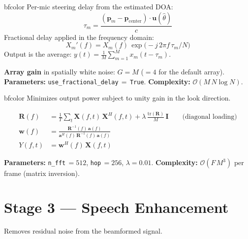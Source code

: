 \documentclass[11pt,a4paper]{article}
\begin{document}
\begin{modulebox}{bfcolor}
Per-mic steering delay from the estimated DOA:
\begin{equation}
\tau_m = \frac{(\mathbf{p}_m - \mathbf{p}_{\text{center}})\cdot\mathbf{u}(\hat\theta)}{c}
\end{equation}
Fractional delay applied in the frequency domain:
\begin{equation}
X_m'(f) = X_m(f)\,\exp\!\big(-j\,2\pi f\,\tau_m / N\big)
\end{equation}
Output is the average: $\displaystyle y(t) = \frac{1}{M}\sum_{m=1}^{M} x_m(t - \tau_m)$.

\medskip\noindent
\textbf{Array gain} in spatially white noise: $G = M$ ($= 4$ for the default array).\\
\textbf{Parameters:} \texttt{use\_fractional\_delay}$\,=$\,\texttt{True}.\quad
\textbf{Complexity:} $\mathcal{O}(M\,N\log N)$.
\end{modulebox}

\begin{modulebox}{bfcolor}
Minimizes output power subject to unity gain in the look direction.

\begin{align}
\mathbf{R}(f) &= \frac{1}{T}\sum_t \mathbf{X}(f,t)\,\mathbf{X}^H(f,t) + \lambda\,\frac{\text{tr}(\mathbf{R})}{M}\,\mathbf{I}
\qquad\text{(diagonal loading)} \\[4pt]
\mathbf{w}(f) &= \frac{\mathbf{R}^{-1}(f)\,\mathbf{a}(f)}{\mathbf{a}^H(f)\,\mathbf{R}^{-1}(f)\,\mathbf{a}(f)} \\[4pt]
Y(f,t) &= \mathbf{w}^H(f)\,\mathbf{X}(f,t)
\end{align}

\noindent\textbf{Parameters:} \texttt{n\_fft}$\,=512$, \texttt{hop}$\,=256$, $\lambda=0.01$.\quad
\textbf{Complexity:} $\mathcal{O}(F\,M^3)$ per frame (matrix inversion).
\end{modulebox}

\section{Stage 3 --- Speech Enhancement}

Removes residual noise from the beamformed signal.
\end{document}
